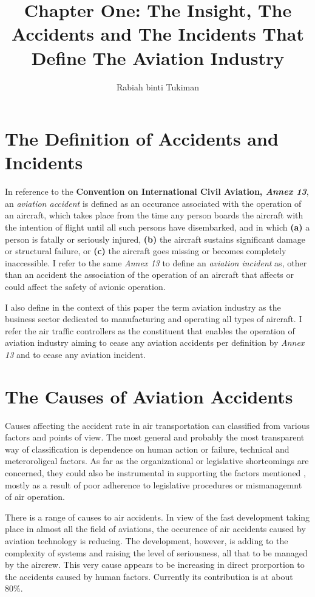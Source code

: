 \documentclass[a4paper,10pt]{article}
\title{Chapter One: The Insight, The Accidents and The Incidents That Define The Aviation Industry}
\author{Rabiah binti Tukiman}
\begin{document}
\maketitle


\section{The Definition of Accidents and Incidents}

In reference to the \textbf{Convention on International Civil Aviation, \textit{Annex 13}}, an \textit{aviation accident} is defined as an occurance 
associated with the operation of an aircraft, which takes place from the time any person boards the aircraft with the intention of flight 
until all such persons have disembarked, and in which 
\textbf{(a)} a person is fatally or seriously injured, 
\textbf{(b)} the aircraft sustains significant damage or structural failure, or 
\textbf{(c)} the aircraft goes missing or becomes completely inaccessible. 
I refer to the same \textit{Annex 13} to define an \textit{aviation incident} as, other than an accident
the association of the operation of an aircraft that affects or could affect the safety of avionic operation. \par
	I also define in the context of this paper the term aviation industry as the business sector dedicated to manufacturing and operating all types of aircraft. I refer the air traffic controllers as the constituent that enables the operation of aviation industry aiming to cease any aviation accidents per definition by \textit{Annex 13} and to cease any aviation incident.
\section{The Causes of Aviation Accidents}
Causes affecting the accident rate in air transportation can classified from various factors and points of
view. The most general and probably the most transparent way of classification is dependence on
human action or failure, technical and meteroroligcal factors. As far as the organizational or
legislative shortcomings are concerned, they could also be instrumental in supporting the factors
mentioned , mostly as a result of poor adherence to legislative procedures or mismanagemnt of air
operation.\par
There is a range of causes to air accidents. In view of the fast development taking place in almost all
the field of aviations, the occurence of air accidents caused by aviation technology is reducing. The
development, however, is adding to the complexity of systems and raising the level of seriousness, all
that to be managed by the aircrew. This very cause appears to be increasing in direct prorportion to
the accidents caused by human factors. Currently its contribution is at about 80\%.\par 	
\end{document}
